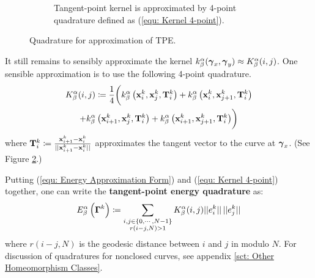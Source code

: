 \documentclass[../dissertation.tex]{subfiles}
\begin{document}
\begin{figure}[tbp]
\begin{subfigure}[b]{0.75\textwidth}
        \caption{Tangent-point kernel is approximated by 4-point quadrature defined as (\ref{equ: Kernel 4-point}).}
        \label{fig: Tangent-point kernel approximation}
    \end{subfigure}
    \caption{Quadrature for approximation of TPE.}
\end{figure}

It still remains to sensibly approximate the kernel $k_{\beta}^{\alpha} (\boldsymbol{\gamma}_x, \boldsymbol{\gamma}_y) \approx K_{\beta}^{\alpha} (i, j)$.
One sensible approximation is to use the following 4-point quadrature\cite{YSC2021}.
\begin{multline}
    K_{\beta}^{\alpha} (i, j) \coloneqq \frac{1}{4} \biggl( k_{\beta}^{\alpha} \left( \mathbf{x}_i^k, \mathbf{x}_j^k, \mathbf{T}_i^k \right)
        + k_{\beta}^{\alpha} \left( \mathbf{x}_i^k, \mathbf{x}_{j+1}^k, \mathbf{T}_i^k \right) \\
        + k_{\beta}^{\alpha} \left( \mathbf{x}_{i+1}^k, \mathbf{x}_j^k, \mathbf{T}_i^k \right)
        + k_{\beta}^{\alpha} \left( \mathbf{x}_{i+1}^k, \mathbf{x}_{j+1}^k, \mathbf{T}_i^k \right)
    \biggr)
    \label{equ: Kernel 4-point}
\end{multline}
where $\mathbf{T}_{i}^k \coloneqq \frac{\mathbf{x}_{i+1}^k - \mathbf{x}_i^k}{\lvert \lvert \mathbf{x}_{i+1}^k - \mathbf{x}_i^k \rvert \rvert}$ approximates the tangent vector to the curve at $\boldsymbol{\gamma}_x$.
(See Figure \ref{fig: Tangent-point kernel approximation}.)

Putting (\ref{equ: Energy Approximation Form}) and (\ref{equ: Kernel 4-point}) together,
one can write the \textbf{tangent-point energy quadrature} as:
\begin{equation}
    E_{\beta}^{\alpha} \left( \boldsymbol{\Gamma}^k \right) \coloneqq \sum_{\substack{i, j \in \left\{ 0, \cdots, N-1 \right\} \\ r \left( i-j,N \right) > 1}} K_{\beta}^{\alpha} (i,j) \lvert \lvert e_i^k \rvert \rvert \, \lvert \lvert e_j^k \rvert \rvert
    \label{equ: Tangent-Point Energy Quadrature}
\end{equation}
where $r\left( i-j,N \right)$ is the geodesic distance between $i$ and $j$ in modulo $N$.
For discussion of quadratures for nonclosed curves, see appendix \ref{sct: Other Homeomorphism Classes}.
\end{document}
